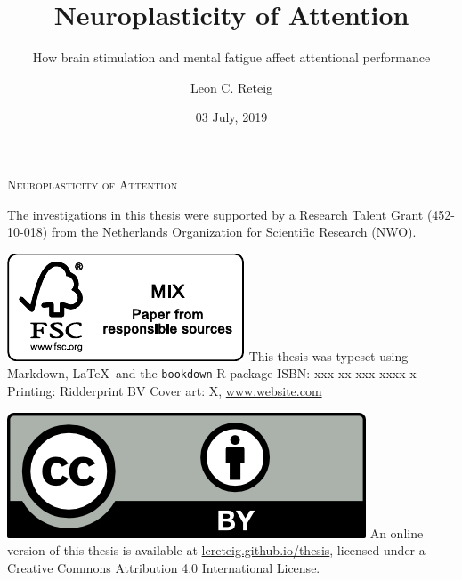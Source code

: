 \documentclass[11pt,]{memoir}
\title{Neuroplasticity of Attention}
\subtitle{How brain stimulation and mental fatigue affect attentional performance}
\author{Leon C. Reteig}
\date{03 July, 2019}
\begin{document}
\maketitle

\frontmatter
\pagestyle{empty} 

\def\drop{.1\textheight}
\vspace*{\drop}
\begin{center}
\Huge \textsc{Neuroplasticity of Attention} %
\end{center}

\clearpage
\vspace*{\fill}
\begingroup %
\small
\setlength{\parskip}{\baselineskip} %
\setlength\parindent{0pt} %
The investigations in this thesis were supported by 
a Research Talent Grant (452-10-018)  %
from 
the Netherlands Organization for Scientific Research (NWO). %

\includegraphics{_bookdown_files/FSC.pdf} \newline
This thesis was typeset using Markdown, \LaTeX\ and the \verb+bookdown+ R-package \newline
ISBN: xxx-xx-xxx-xxxx-x \newline %
Printing: Ridderprint BV \newline %
Cover art: X, \url{www.website.com} %

\includegraphics{_bookdown_files/CC-BY.png} \newline
An online version of this thesis is available at 
\url{lcreteig.github.io/thesis},  %
licensed under a 
Creative Commons Attribution 4.0 International License. %
\endgroup
\end{document}
